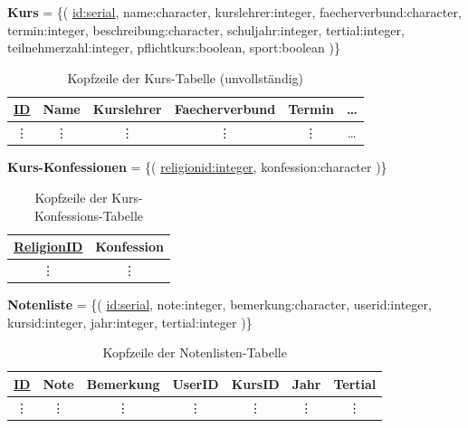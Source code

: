 \textbf{Kurs} = \{( \underline{id:serial}, name:character, kurslehrer:integer, faecherverbund:character, termin:integer, beschreibung:character, schuljahr:integer, tertial:integer, 
teilnehmerzahl:integer, pflichtkurs:boolean, sport:boolean )\}

\begin{table}[H]
\begin{center}
	\begin{tabular}{|c|c|c|c|c|c}\hline
		\textbf{\underline{ID}} & \textbf{Name} & \textbf{Kurslehrer} & \textbf{Faecherverbund} & \textbf{Termin} & \dots \\ \hline
		\vdots & \vdots & \vdots & \vdots & \vdots & \dots \\
	\end{tabular}
	\caption{Kopfzeile der Kurs-Tabelle  (unvollständig)}
\end{center}
\end{table}

\textbf{Kurs-Konfessionen} = \{( \underline{religionid:integer}, konfession:character )\} 
 
\begin{table}[H]
\begin{center}
	\begin{tabular}{|c|c|}\hline
		\textbf{\underline{ReligionID}} & \textbf{Konfession} \\ \hline
		\vdots & \vdots \\
	\end{tabular}
	\caption{Kopfzeile der Kurs-Konfessions-Tabelle}
\end{center}
\end{table}

\textbf{Notenliste} = \{( \underline{id:serial}, note:integer, bemerkung:character, userid:integer, kursid:integer, jahr:integer, tertial:integer )\}

\begin{table}[H]
\begin{center}
	\begin{tabular}{|c|c|c|c|c|c|c|}\hline
		\textbf{\underline{ID}} & \textbf{Note} & \textbf{Bemerkung} & \textbf{UserID} & \textbf{KursID} & \textbf{Jahr} & \textbf{Tertial}\\ \hline
		\vdots & \vdots & \vdots & \vdots & \vdots & \vdots & \vdots  \\
	\end{tabular}
	\caption{Kopfzeile der Notenlisten-Tabelle}
\end{center}
\end{table}

